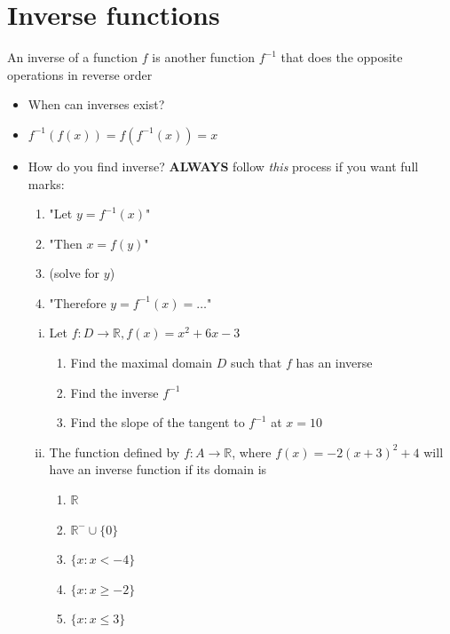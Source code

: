 \documentclass[12pt]{article}
\begin{document}
\section{Inverse functions}
An inverse of a function $f$ is another function $f^{-1}$ that does the opposite operations in reverse order
\begin{itemize}
    \item When can inverses exist?
    \vspace{3cm}

    \item $f^{-1}(f(x)) = f(f^{-1}(x)) = x$
    \item How do you find inverse? \textbf{ALWAYS} follow \textit{this} process if you want full marks:
    \begin{enumerate}
        \item "Let $y = f^{-1}(x)$"
        \item "Then $x = f(y)$" 
        \item (solve for $y$)
        \item "Therefore $y = f^{-1}(x) = \dots$"
    \end{enumerate}

    \begin{enumerate}[(i)]
        \item Let $f: D \to \mathbb{R}, f(x) = x^{2}+6x - 3$
        \begin{enumerate}
            \item Find the maximal domain $D$ such that $f$ has an inverse
            \item Find the inverse $f^{-1}$
            \item Find the slope of the tangent to $f^{-1}$ at $x = 10$
        \end{enumerate}
        \vspace{5cm}

        \item The function defined by $f : A \to \mathbb{R}$, where $f(x) = -2(x+3)^2 + 4$ will have an inverse function if its domain is
        \begin{enumerate}
            \item[A.] $\mathbb{R}$
            \item[B.] $\mathbb{R}^- \cup \{0\}$
            \item[C.] $\{x : x < -4\}$
            \item[D.] $\{x : x \geq -2\}$
            \item[E.] $\{x : x \leq 3\}$
        \end{enumerate}
    \end{enumerate}
    

\end{itemize}
\end{document}
